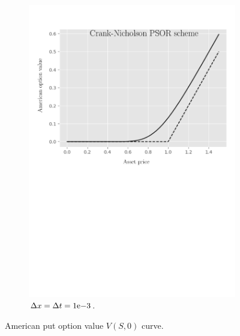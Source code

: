 \begin{figure}[H]
\begin{subfigure}{0.4\textwidth}
    \includegraphics[width=\textwidth]{chapters/chapter5/TestCase1CrankNicholsonLCP.pdf}
    \caption{$\Delta{x}=\Delta{t}={1}\mathrm{e}{-3}$.}
  \end{subfigure}
  \caption{American put option value $V(S, 0)$ curve.}
  \label{fig:lcp:numericaresults:numericaresults:test_case_1}
\end{figure}
